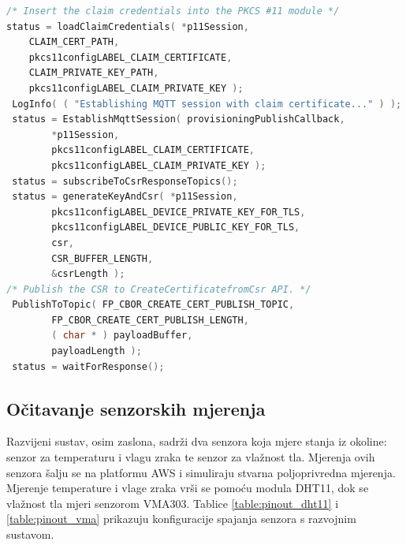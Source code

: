 \begin{lstlisting}[caption={Spajanje certifikatom zahtjeva i zahtjev za novim certifikatom}, language=c]
/* Insert the claim credentials into the PKCS #11 module */
status = loadClaimCredentials( *p11Session,
	CLAIM_CERT_PATH,
	pkcs11configLABEL_CLAIM_CERTIFICATE,
	CLAIM_PRIVATE_KEY_PATH,
	pkcs11configLABEL_CLAIM_PRIVATE_KEY );
 LogInfo( ( "Establishing MQTT session with claim certificate..." ) );
 status = EstablishMqttSession( provisioningPublishCallback,
		*p11Session,
		pkcs11configLABEL_CLAIM_CERTIFICATE,
		pkcs11configLABEL_CLAIM_PRIVATE_KEY );
 status = subscribeToCsrResponseTopics();
 status = generateKeyAndCsr( *p11Session,
		pkcs11configLABEL_DEVICE_PRIVATE_KEY_FOR_TLS,
		pkcs11configLABEL_DEVICE_PUBLIC_KEY_FOR_TLS,
		csr,
		CSR_BUFFER_LENGTH,
		&csrLength );
/* Publish the CSR to CreateCertificatefromCsr API. */
 PublishToTopic( FP_CBOR_CREATE_CERT_PUBLISH_TOPIC,
		FP_CBOR_CREATE_CERT_PUBLISH_LENGTH,
		( char * ) payloadBuffer,
		payloadLength );
 status = waitForResponse();
\end{lstlisting}

\subsection{Očitavanje senzorskih mjerenja}

Razvijeni sustav, osim zaslona, sadrži dva senzora koja mjere stanja iz okoline: senzor za temperaturu i vlagu zraka te senzor za vlažnost tla. Mjerenja ovih senzora šalju se na platformu AWS i simuliraju stvarna poljoprivredna mjerenja. Mjerenje temperature i vlage zraka vrši se pomoću modula DHT11, dok se vlažnost tla mjeri senzorom VMA303. Tablice \ref{table:pinout_dht11} i \ref{table:pinout_vma} prikazuju konfiguracije spajanja senzora s razvojnim sustavom. 

